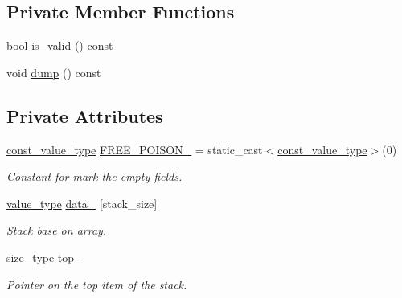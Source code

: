 \subsection*{Private Member Functions}
\begin{DoxyCompactItemize}
\item 
bool \hyperlink{classstk_1_1stack__t_a6c1813c8dc347f0cc9ab94a6e120d743}{is\+\_\+valid} () const
\item 
void \hyperlink{classstk_1_1stack__t_ac6b1f910422f3402f4ffcc8d496d0273}{dump} () const
\end{DoxyCompactItemize}
\subsection*{Private Attributes}
\begin{DoxyCompactItemize}
\item 
\mbox{\label{classstk_1_1stack__t_a34489e147dc7052c6ee4eaa70c31c009}} 
\hyperlink{classstk_1_1stack__t_a27d586bc06e0faf30a2a980cd8ffd125}{const\+\_\+value\+\_\+type} \hyperlink{classstk_1_1stack__t_a34489e147dc7052c6ee4eaa70c31c009}{F\+R\+E\+E\+\_\+\+P\+O\+I\+S\+O\+N\+\_\+} = static\+\_\+cast$<$\hyperlink{classstk_1_1stack__t_a27d586bc06e0faf30a2a980cd8ffd125}{const\+\_\+value\+\_\+type}$>$(0)
\begin{DoxyCompactList}\small\item\em Constant for mark the empty fields. \end{DoxyCompactList}\item 
\mbox{\label{classstk_1_1stack__t_a740287c74a7e188220ef94e4dbd5a3ea}} 
\hyperlink{classstk_1_1stack__t_a05d1586fa8257268f0c1ade7ffc4588e}{value\+\_\+type} \hyperlink{classstk_1_1stack__t_a740287c74a7e188220ef94e4dbd5a3ea}{data\+\_\+} \mbox{[}stack\+\_\+size\mbox{]}
\begin{DoxyCompactList}\small\item\em Stack base on array. \end{DoxyCompactList}\item 
\mbox{\label{classstk_1_1stack__t_a9c23414b1fa07a11c14f2abb029ee676}} 
\hyperlink{classstk_1_1stack__t_ade199c494a8e4455f76cc04faf138ed8}{size\+\_\+type} \hyperlink{classstk_1_1stack__t_a9c23414b1fa07a11c14f2abb029ee676}{top\+\_\+}
\begin{DoxyCompactList}\small\item\em Pointer on the top item of the stack. \end{DoxyCompactList}\end{DoxyCompactItemize}


